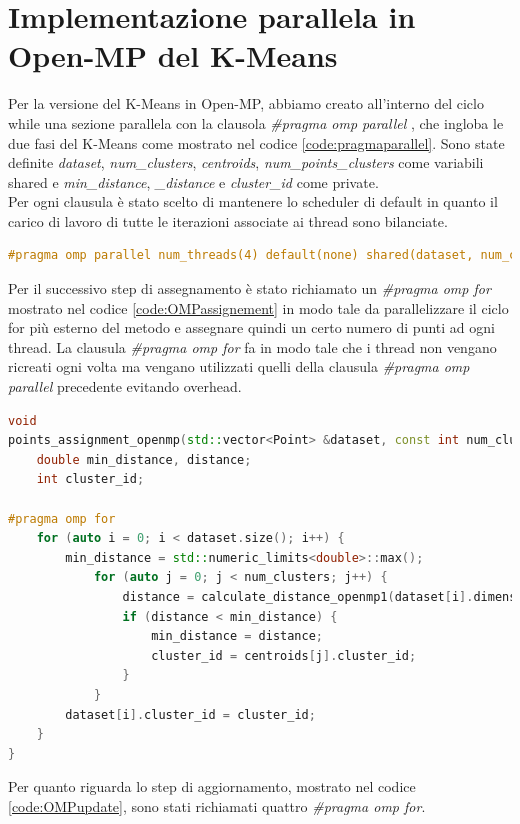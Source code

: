 \documentclass[10pt,twocolumn,letterpaper]{article}
\begin{document}
\section{Implementazione parallela in Open-MP del K-Means}
Per la versione del K-Means in Open-MP, abbiamo creato all'interno del ciclo while una sezione parallela con la clausola \textit{\#pragma omp parallel} , che ingloba le due fasi del K-Means come mostrato nel codice \ref{code:pragmaparallel}. Sono state definite \textit{dataset}, \textit{num\_clusters}, \textit{centroids}, \textit{num\_points\_clusters} come variabili shared e \textit{min\_distance}, \textit{\_distance} e \textit{cluster\_id} come private.\\
Per ogni clausula è stato scelto di mantenere lo scheduler di default in quanto il carico di lavoro di tutte le iterazioni associate ai thread sono bilanciate.
\begin{lstlisting}[language=c++, caption=\#pragma omp parallel, label=code:pragmaparallel]
#pragma omp parallel num_threads(4) default(none) shared(dataset, num_clusters, centroids, num_points_clusters)
\end{lstlisting}
Per il successivo step di assegnamento è stato richiamato un \textit{\#pragma omp for} mostrato nel codice \ref{code:OMPassignement} in modo tale da parallelizzare il ciclo for più esterno del metodo e assegnare quindi un certo numero di punti ad ogni thread. La clausula \textit{\#pragma omp for} fa in modo tale che i thread non vengano ricreati ogni volta ma vengano utilizzati quelli della clausula \textit{\#pragma omp parallel} precedente evitando overhead.
\begin{lstlisting}[language=c++, caption=Assegnamento Open-MP, label=code:OMPassignement]
void
points_assignment_openmp(std::vector<Point> &dataset, const int num_clusters, const std::vector<Point> &centroids) {
	double min_distance, distance;
	int cluster_id;
	
#pragma omp for
	for (auto i = 0; i < dataset.size(); i++) {
		min_distance = std::numeric_limits<double>::max();
			for (auto j = 0; j < num_clusters; j++) {
				distance = calculate_distance_openmp1(dataset[i].dimensions, centroids[j].dimensions);
				if (distance < min_distance) {
					min_distance = distance;
					cluster_id = centroids[j].cluster_id;
				}
			}
		dataset[i].cluster_id = cluster_id;
	}
}
\end{lstlisting}
Per quanto riguarda lo step di aggiornamento, mostrato nel codice \ref{code:OMPupdate}, sono stati richiamati quattro \textit{\#pragma omp for}.\\
\end{document}
